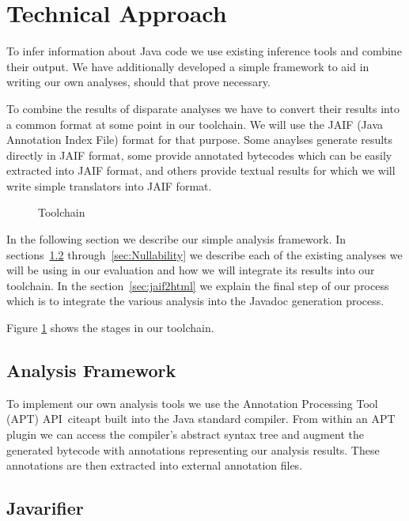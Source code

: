 \section{Technical Approach}
To infer information about Java code we use existing inference tools and
combine their output. We have additionally developed a simple framework to aid
in writing our own analyses, should that prove necessary.

To combine the results of disparate analyses we have to convert their results
into a common format at some point in our toolchain.  We will use the JAIF
(Java Annotation Index File) format for that purpose.  Some anaylses generate
results directly in JAIF format, some provide annotated bytecodes which can be
easily extracted into JAIF format, and others provide textual results for which
we will write simple translators into JAIF format.

\begin{figure}
\centering
{}
\caption{Toolchain}
\label{fig:toolchain}
\end{figure}

In the following section we describe our simple analysis framework.  In
sections~\ref{sec:Javarifier} through~\ref{sec:Nullability} we describe each of
the existing analyses we will be using in our evaluation and how we will
integrate its results into our toolchain. In the section~\ref{sec:jaif2html} we
explain the final step of our process which is to integrate the various
analysis into the Javadoc generation process.

Figure \ref{fig:toolchain} shows the stages in our toolchain.

\subsection{Analysis Framework}
\label{ss:analysisFramework}

To implement our own analysis tools we use the Annotation Processing Tool (APT)
API~cite{apt} built into the Java standard compiler.  From within an APT plugin
we can access the compiler's abstract syntax tree and augment the generated
bytecode with annotations representing our analysis results. These annotations
are then extracted into external annotation files.

\subsection{Javarifier}
\label{sec:Javarifier}

